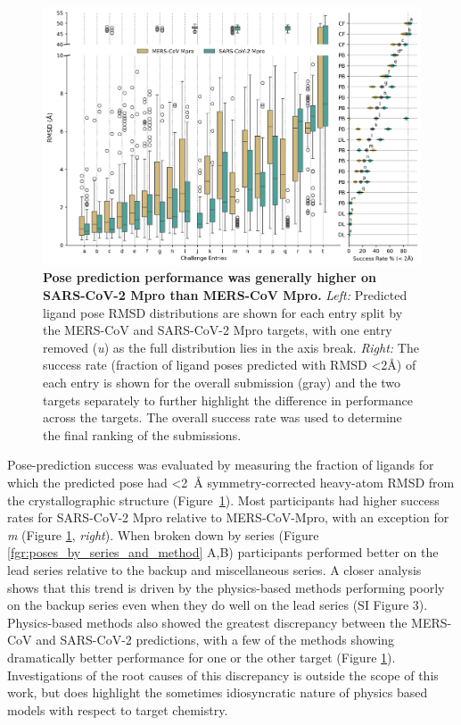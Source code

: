 \documentclass[journal=jcim,manuscript=article]{achemso}
\begin{document}
{\begin{figure}
    \includegraphics[width=6in
    ]{04_figs_leaderboards/pose_comp.png}
  \caption{\textbf{Pose prediction performance was generally higher on SARS-CoV-2 Mpro than MERS-CoV Mpro.}
 \emph{Left:} Predicted ligand pose RMSD distributions are shown for each entry split by the MERS-CoV and SARS-CoV-2 Mpro targets, with one entry removed (\textit{u}) as the full distribution lies in the axis break. \emph{Right:} The success rate (fraction of ligand poses predicted with RMSD \textless2Å) of each entry is shown for the overall submission (gray) and the two targets separately to further highlight the difference in performance across the targets. The overall success rate was used to determine the final ranking of the submissions.}
  \label{fgr:poses_leaderboard}
\end{figure}

Pose-prediction success was evaluated by measuring the fraction of ligands for which the predicted pose had \textless 2~Å symmetry-corrected heavy-atom RMSD from the crystallographic structure (Figure~\ref{fgr:poses_leaderboard}). Most participants had higher success rates for SARS-CoV-2 Mpro relative to MERS-CoV-Mpro, with an exception for \textit{m} (Figure \ref{fgr:poses_leaderboard}, \emph{right}). When broken down by series (Figure \ref{fgr:poses_by_series_and_method} A,B) participants performed better on the lead series relative to the backup and miscellaneous series. A closer analysis shows that this trend is driven by the physics-based methods performing poorly on the backup series even when they do well on the lead series (SI Figure 3). Physics-based methods also showed the greatest discrepancy between the MERS-CoV and SARS-CoV-2 predictions, with a few of the methods showing dramatically better performance for one or the other target (Figure \ref{fgr:poses_leaderboard}). Investigations of the root causes of this discrepancy is outside the scope of this work, but does highlight the sometimes idiosyncratic nature of physics based models with respect to target chemistry. 

}
\end{document}
